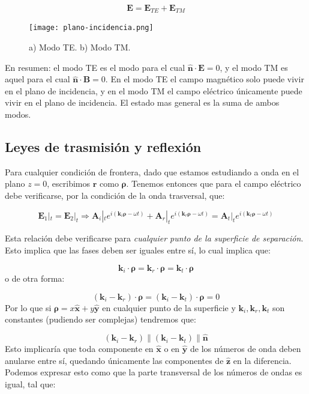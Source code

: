 \documentclass[12pt]{article}
\newcommand{\Bn}{\mathbf{B}}
\newcommand{\En}{\mathbf{E}}
\newcommand{\kn}{\mathbf{k}}
\newcommand{\rn}{\mathbf{r}}
\newcommand{\An}{\mathbf{A}}
\newcommand{\hnn}{\hat{\mathbf{n}}}
\newcommand{\hnz}{\hat{\mathbf{z}}}
\newcommand{\hnx}{\hat{\mathbf{x}}}
\newcommand{\hny}{\hat{\mathbf{y}}}
\newcommand{\nrho}{\boldsymbol{\rho}}
\numberwithin{equation}{section}
\numberwithin{figure}{section}
\begin{document}
\begin{equation}
\En = \En_{TE} + \En_{TM}
\end{equation}

\begin{figure}[h!] \centering
\texttt{[image: plano-incidencia.png]}
\caption{a) Modo TE. b) Modo TM.}
\end{figure}

En resumen: el modo TE es el modo para el cual $\hnn \cdot \En = 0$, y el modo TM es aquel para el cual $\hnn \cdot \Bn = 0$. En el modo TE el campo magnético solo puede vivir en el plano de incidencia, y en el modo TM el campo eléctrico únicamente puede vivir en el plano de incidencia. El estado mas general es la suma de ambos modos.

\subsection{Leyes de trasmisión y reflexión}

Para cualquier condición de frontera, dado que estamos estudiando a onda en el plano $z=0$, escribimos $\rn$ como $\nrho$. Tenemos entonces que para el campo eléctrico debe verificarse, por la condición de la onda trasversal, que:

\begin{equation} 
\En_1 |_t = \En_2 |_t \Longrightarrow \An_i |_t e^{i(\kn_i \nrho - \omega t)} + \An_r |_t e^{i(\kn_r \nrho - \omega t)} = \An_t |_t e^{i(\kn_t \nrho - \omega t)}
\end{equation}

Esta relación debe verificarse para \textit{cualquier punto de la superficie de separación}. Esto implica que las fases deben ser iguales entre sí, lo cual implica que:

\begin{equation}
\kn_i \cdot \nrho = 
\kn_r \cdot \nrho = 
\kn_t \cdot \nrho 
\end{equation}
o de otra forma:

\begin{equation}
(\kn_i - \kn_r) \cdot \nrho = 
(\kn_i - \kn_t) \cdot \nrho = 0
\end{equation}
Por lo que si $\nrho=x\hnx+ y \hny $ en cualquier punto de la superficie y $\kn_i,\kn_r,\kn_t$ son constantes (pudiendo ser complejas) tendremos que:

\begin{equation}
(\kn_i - \kn_r) \parallel (\kn_i - \kn_t) \parallel \hnn 
\end{equation}
Esto implicaría que toda componente en $\hnx$ o en $\hny$ de los números de onda deben anularse entre sí, quedando únicamente las componentes de $\hnz$ en la diferencia. Podemos expresar esto como que la parte transversal de los números de ondas es igual, tal que:
\end{document}
